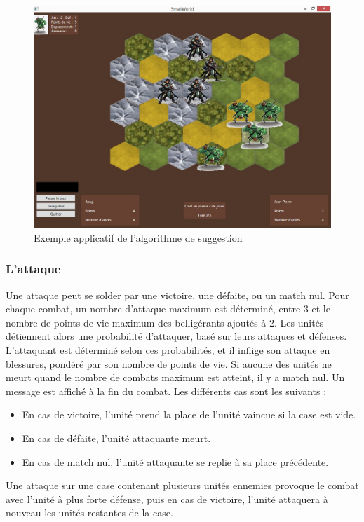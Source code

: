 \newpage
\begin{figure}[ht!]
\centering
\includegraphics[scale=0.50]{img/algo.jpg}
\caption{Exemple applicatif de l'algorithme de suggestion}
\end{figure}

\newpage
\subsubsection{L'attaque}

Une attaque peut se solder par une victoire, une défaite, ou un match nul.
\newline
Pour chaque combat, un nombre d'attaque maximum est déterminé, entre 3 et le nombre de points de vie maximum des belligérants ajoutés à 2.
\newline
\newline
Les unités détiennent alors une probabilité d'attaquer, basé sur leurs attaques et défenses.
\newline
 L'attaquant est déterminé selon ces probabilités, et il inflige son attaque en blessures, pondéré par son nombre de points de vie.
\newline
Si aucune des unités ne meurt quand le nombre de combats maximum est atteint, il y a match nul.
\newline
\newline
Un message est affiché à la fin du combat.
\newline
 Les différents cas sont les suivants :
\begin{itemize}
\item En cas de victoire, l'unité prend la place de l'unité vaincue si la case est vide.
\item En cas de défaite, l'unité attaquante meurt.
\item En cas de match nul, l'unité attaquante se replie à sa place précédente.
\newline
\end{itemize}
Une attaque sur une case contenant plusieurs unités ennemies provoque le combat avec l'unité à plus forte défense, puis en cas de victoire, l'unité attaquera à nouveau les unités restantes de la case.

